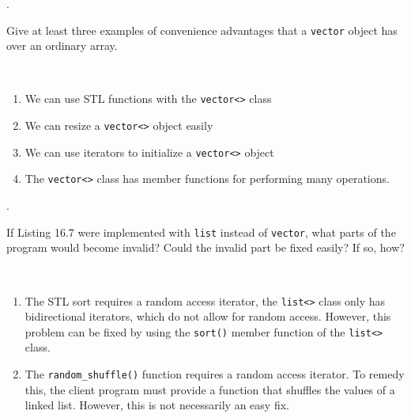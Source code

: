 \documentclass{amsart}
\begin{document}
. 
\begin{minipage}[t]{11.5 cm}
	Give at least three examples of convenience advantages that a \texttt{vector} object has over an ordinary array.
\end{minipage} \\[1ex]
\phantom{2. } 
\begin{minipage}[t]{11.5 cm}
	{\slshape 
		\begin{enumerate}
			\item
				We can use STL functions with the \verb+vector<>+ class
			\item
				We can resize a \verb+vector<>+ object easily
			\item
				We can use iterators to initialize a \verb+vector<>+ object
			\item
				The \verb+vector<>+ class has member functions for
				performing many operations.
		\end{enumerate}
	} 
\end{minipage} 
\vfill

. 
\begin{minipage}[t]{11.5 cm}
	If Listing 16.7 were implemented with \texttt{list} instead of \texttt{vector}, what parts of the program would become invalid? Could the invalid part be fixed easily? If so, how?
\end{minipage} \\[1ex]
\phantom{3. } 
\begin{minipage}[t]{11.5 cm}
	{\slshape 
		\begin{enumerate}
			\item
				The STL sort requires a random access iterator, the 
				\verb+list<>+ class only has bidirectional iterators, which
				do not allow for random access.
				However, this problem can be fixed by using the 
				\verb+sort()+ member function of the \verb+list<>+ class.
			\item
				The \verb+random_shuffle()+ function requires
				a random access iterator. 
				To remedy this, the client program must provide a function
				that shuffles the values of a linked list.
				However, this is not necessarily an easy fix.
		\end{enumerate}
	} 
\end{minipage} 
\vfill
\end{document}
